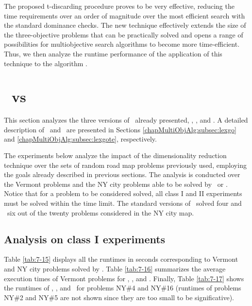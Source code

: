 The proposed t-discarding procedure proves to be very effective, reducing the time requirements over an order of magnitude over the most efficient search with the standard dominance checks. The new technique effectively extends the size of the three-objective problems that can be practically solved and opens a range of possibilities for multiobjective search algorithms to become more time-efficient. Thus, we then analyze the runtime performance of the application of this technique to the algorithm \lexgo.

\section{\texorpdfstring{\lexgote}{LEXGO*dr} \ vs \texorpdfstring{\lexgo}{LEXGO*}}
\label{chapEmpiricalAnalysis:sec:resultsdimacslexgote}

This section analyzes the three versions of \lexgo \ already presented, \lexgolex, \lexgolin, and \lexgote. A detailed description of \lexgo \ and \lexgote \ are presented in Sections \ref{chapMultiObjAlg:subsec:lexgo} and \ref{chapMultiObjAlg:subsec:lexgote}, respectively. 

The experiments below analyze the impact of the dimensionality reduction technique over the sets of random road map problems previously used, employing the goals already described in previous sections. The analysis is conducted over the Vermont problems and the NY city problems able to be solved by \lexgolex \ or \lexgolin. Notice that for a problem to be considered solved, all class I and II experiments must be solved within the time limit. The standard versions of \lexgo \ solved four and \lexgote \ six out of the twenty problems considered in the NY city map. 

\subsection{Analysis on class I experiments}
\label{chapEmpiricalAnalysis:subsec:analysisdimacslexgotec1}

Table \ref{tab:7-15} displays all the runtimes in seconds corresponding to Vermont and NY city problems solved by \lexgote. Table \ref{tab:7-16} summarizes the average execution times of Vermont problems for \lexgolex, \lexgolin, and \lexgote. Finally, Table \ref{tab:7-17} shows the runtimes of \lexgolex, \lexgolin, and \lexgote \ for problems NY\#4 and NY\#16 (runtimes of problems NY\#2 and NY\#5 are not shown since they are too small to be significative). 

